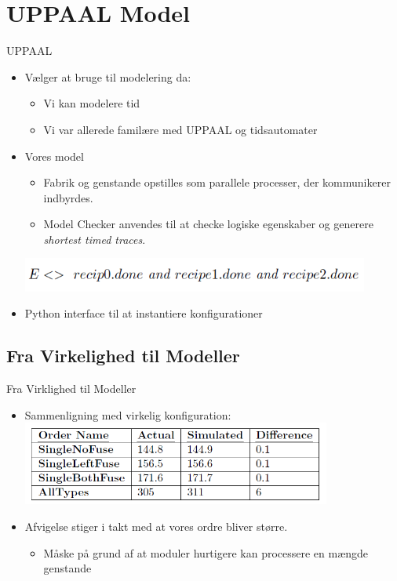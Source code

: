 \section{UPPAAL Model}
\begin{frame}{UPPAAL}{}
  \begin{itemize}
  \item<1->  Vælger at bruge til modelering da:
  \begin{itemize}
  \item Vi kan modelere tid
  \item Vi var allerede familære med UPPAAL og tidsautomater
  \end{itemize}
  \item<2-> Vores model
	\begin{itemize}
	\item  Fabrik og genstande opstilles som parallele processer, der kommunikerer indbyrdes.   
	\item Model Checker anvendes til at checke logiske egenskaber og generere \textit{shortest timed traces}.	
\end{itemize}	  
    \includegraphics[width=0.9\textwidth]{figures/property.png}   
    
    \item<3-> Python interface til at instantiere konfigurationer
  \end{itemize}
\end{frame}

\subsection{Fra Virkelighed til Modeller}
\begin{frame}{Fra Virklighed til Modeller}{}
  \begin{itemize}
  \item<1->  Sammenligning med virkelig konfiguration:
  \includegraphics[width=0.8\textwidth]{figures/realTest.png}
  \item<2-> Afvigelse stiger i takt med at vores ordre bliver større.
\begin{itemize}
\item Måske på grund af at moduler hurtigere kan processere en mængde genstande  
\end{itemize}  
    \end{itemize}
\end{frame}

